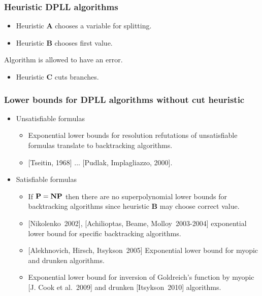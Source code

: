\begin{frame}
	\frametitle{Heuristic DPLL algorithms}

   	
    
	\pause
    \pause
    \pause
    \pause
    \pause
    \begin{itemize}
        \item Heuristic $\mathbf{A}$ chooses a variable for splitting.
    	\pause
	    \item Heuristic $\mathbf{B}$ chooses first value.
    \end{itemize}

    \pause
    Algorithm is allowed to have an error.

    \pause
    \pause
    \begin{itemize}
	    \item Heuristic $\mathbf{C}$ cuts branches.
    \end{itemize}
\end{frame}

\begin{frame}
    \frametitle{Lower bounds for DPLL algorithms without cut heuristic}

    \pause
	\begin{itemize}
		\item Unsatisfiable formulas
		\begin{itemize}
            \item{} Exponential lower bounds for resolution refutations
				of unsatisfiable formulas translate to backtracking
                algorithms.
			\item{} [Tseitin, 1968] ... [Pudlak, Implagliazzo, 2000].
		\end{itemize}
        \pause
		\item Satisfiable formulas
		\begin{itemize}
			\item If $\bf P = NP$ then there are no superpolynomial
		        lower bounds for backtracking algorithms since
                heuristic $\mathbf{B}$ may choose correct value.
            \pause
            \item{} [Nikolenko~2002], [Achilioptas, Beame, Molloy~2003-2004]
				exponential lower bound for specific backtracking
                algorithms.
            \item{} [Alekhnovich, Hirsch, Itsykson~2005] Exponential lower bound 
				for myopic and drunken algorithms.
            \pause
            \item{}  Exponential lower bound 
		for inversion of Goldreich's function by myopic [J. Cook et al.~2009] 
		and drunken [Itsykson~2010] algorithms.
		\end{itemize}
	\end{itemize}
\end{frame}


